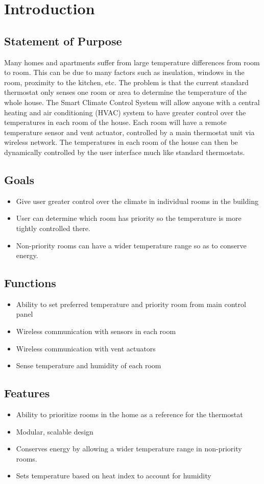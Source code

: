 \section{Introduction}
\subsection{Statement of Purpose}
Many homes and apartments suffer from large temperature differences from room to room. This can be due to many factors such as insulation, windows in the room, proximity to the kitchen, etc.  The problem is that the current standard thermostat only senses one room or area to determine the temperature of the whole house.  The Smart Climate Control System will allow anyone with a central heating and air conditioning (HVAC) system to have greater control over the temperatures in each room of the house.  Each room will have a remote temperature sensor and vent actuator, controlled by a main thermostat unit via wireless network.  The temperatures in each room of the house can then be dynamically controlled by the user interface much like standard thermostats.

\subsection{Goals}
\begin{itemize}
\item
Give user greater control over the climate in individual rooms in the building
\item
User can determine which room has priority so the temperature is more tightly controlled there.
\item
Non-priority rooms can have a wider temperature range so as to conserve energy.
\end{itemize}

\subsection{Functions}
\begin{itemize}
\item
Ability to set preferred temperature and priority room from main control panel
\item
Wireless communication with sensors in each room
\item
Wireless communication with vent actuators
\item
Sense temperature and humidity of each room
\end{itemize}

\subsection{Features}
\begin{itemize}
\item
Ability to prioritize rooms in the home as a reference for the thermostat
\item
Modular, scalable design
\item
Conserves energy by allowing a wider temperature range in non-priority rooms.
\item
Sets temperature based on heat index to account for humidity
\end{itemize}
